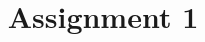 \documentclass[a4paper,12pt,oneside]{book}
\begin{document}
\title{Assignment 1}

   
\end{document}
